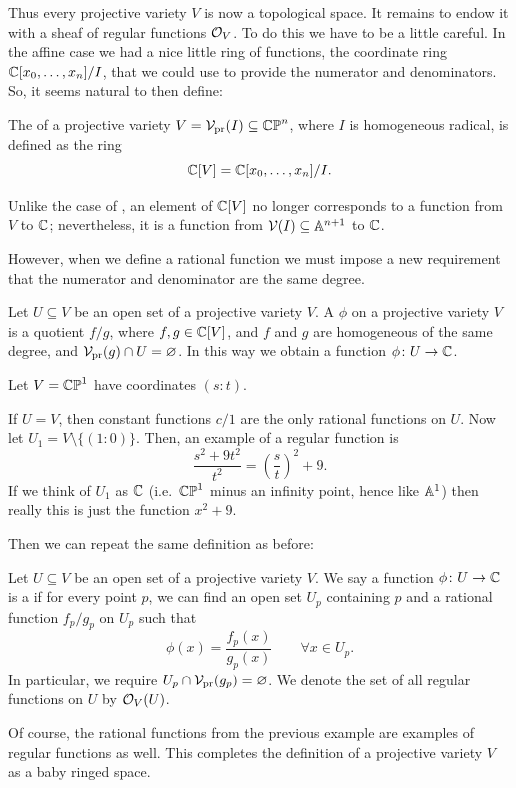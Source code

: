 Thus every projective variety $V$ is now a topological space.
It remains to endow it with a sheaf of regular functions $\mathcal O_V$.
To do this we have to be a little careful.
In the affine case we had a nice little ring of functions,
the coordinate ring $\mathbb C[x_0,\dots,x_n] / I$,
that we could use to provide the numerator and denominators.
So, it seems natural to then define:
\begin{definition}
	The  of a projective variety
	$V = \mathcal V_{\text{pr}}(I) \subseteq \mathbb{CP}^n$, where $I$ is homogeneous radical,
	is defined as the ring
	\[ \mathbb C[V] = \mathbb C[x_0, \dots, x_n] / I. \]
\end{definition}

\begin{remark}
	Unlike the case of , an element
	of $\mathbb C[V]$ no longer corresponds to a function from $V$ to $\mathbb C$;
	nevertheless, it is a function from $\mathcal V(I) \subseteq \mathbb A^{n+1}$ to $\mathbb C$.
\end{remark}

However, when we define a rational function we must impose
a new requirement that the numerator and denominator are the same degree.
\begin{definition}
	Let $U \subseteq V$ be an open set of a projective variety $V$.
	A  $\phi$ on a projective variety $V$
	is a quotient $f/g$, where $f,g \in \mathbb C[V]$,
	and $f$ and $g$ are homogeneous of the same degree,
	and $\mathcal V_{\text{pr}}(g) \cap U = \varnothing$.
	In this way we obtain a function $\phi \colon U \to \mathbb C$.
\end{definition}
\begin{example}
	Let $V = \mathbb{CP}^1$ have coordinates $(s:t)$.
	\begin{enumerate}[(a)]
		\ii If $U = V$, then constant functions $c/1$
		are the only rational functions on $U$.
		\ii Now let $U_1 = V \setminus \{(1:0)\}$.
		Then, an example of a regular function is
		\[ \frac{s^2+9t^2}{t^2} = \left( \frac st \right)^2 + 9. \]
		If we think of $U_1$ as $\mathbb C$
		(i.e.\ $\mathbb{CP}^1$ minus an infinity point, hence like $\mathbb A^1$)
		then really this is just the function $x^2+9$.
	\end{enumerate}
\end{example}
Then we can repeat the same definition as before:
\begin{definition}
	Let $U \subseteq V$ be an open set of a projective variety $V$.
	We say a function $\phi \colon U \to \mathbb C$ is a  if
	for every point $p$, we can find an open set $U_p$ containing $p$
	and a rational function $f_p/g_p$ on $U_p$ such that
	\[ \phi(x) = \frac{f_p(x)}{g_p(x)} \qquad \forall x \in U_p. \]
	In particular, we require $U_p \cap \mathcal V_{\text{pr}}(g_p) = \varnothing$.
	We denote the set of all regular functions on $U$ by $\mathcal O_V(U)$.
\end{definition}
Of course, the rational functions from the previous example
are examples of regular functions as well.
This completes the definition of a projective variety $V$
as a baby ringed space.

